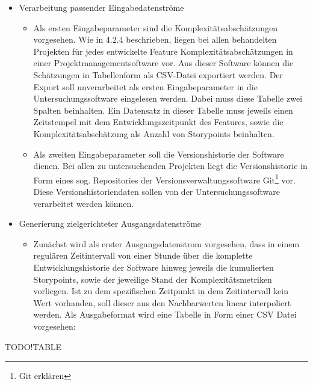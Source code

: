 \begin{itemize}
\item
    Verarbeitung passender Eingabedatenströme

    \begin{itemize}
    \item
    Als ersten Eingabeparameter sind die Komplexitätsabschätzungen
    vorgesehen. Wie in 4.2.4 beschrieben, liegen bei allen behandelten
    Projekten für jedes entwickelte Feature Komplexitätsabschätzungen in
    einer Projektmanagementsoftware vor. Aus dieser Software können die
    Schätzungen in Tabellenform als CSV-Datei exportiert werden. Der
    Export soll unverarbeitet als ersten Eingabeparameter in die
    Untersuchungssoftware eingelesen werden. Dabei muss diese Tabelle
    zwei Spalten beinhalten. Ein Datensatz in dieser Tabelle muss
    jeweils einen Zeitstempel mit dem Entwicklungszeitpunkt des
    Features, sowie die Komplexitätsabschätzung als Anzahl von
    Storypoints beinhalten.
    \item
    Als zweiten Eingabeparameter soll die Versionshistorie der Software
    dienen. Bei allen zu untersuchenden Projekten liegt die
    Versionshistorie in Form eines sog. Repositories der
    Versionsverwaltungssoftware Git\footnote{Git erklären} vor. Diese
    Versionshistoriendaten sollen von der Untersuchungssoftware
    verarbeitet werden können.
    \end{itemize}
\item
    Generierung zielgerichteter Ausgangsdatenströme

    \begin{itemize}
    \item
    Zunächst wird als erster Ausgangsdatenstrom vorgesehen, dass in
    einem regulären Zeitintervall von einer Stunde über die komplette
    Entwicklungshistorie der Software hinweg jeweils die kumulierten
    Storypoints, sowie der jeweilige Stand der Komplexitätsmetriken
    vorliegen. Ist zu dem spezifischen Zeitpunkt in dem Zeitintervall
    kein Wert vorhanden, soll dieser aus den Nachbarwerten linear
    interpoliert werden. Als Ausgabeformat wird eine Tabelle in Form
    einer CSV Datei vorgesehen:
    \end{itemize}
\end{itemize}

TODO!TABLE

